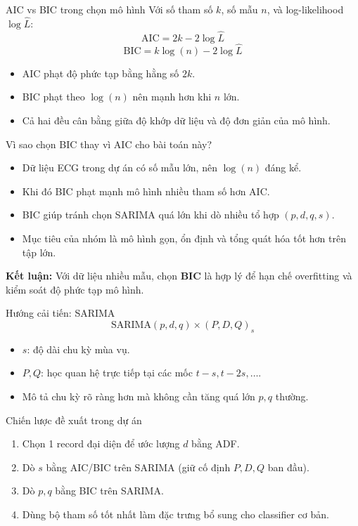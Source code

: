 \documentclass{beamer}
\begin{document}
\begin{frame}{AIC vs BIC trong chọn mô hình}
    Với số tham số $k$, số mẫu $n$, và log-likelihood $\log\hat{L}$:
    \[
        \text{AIC} = 2k - 2\log\hat{L}
    \]
    \[
        \text{BIC} = k\log(n) - 2\log\hat{L}
    \]
    \vspace{0.3cm}
    \begin{itemize}
        \item AIC phạt độ phức tạp bằng hằng số $2k$.
        \item BIC phạt theo $\log(n)$ nên mạnh hơn khi $n$ lớn.
        \item Cả hai đều cân bằng giữa độ khớp dữ liệu và độ đơn giản của mô hình.
    \end{itemize}
\end{frame}

\begin{frame}{Vì sao chọn BIC thay vì AIC cho bài toán này?}
    \begin{itemize}
        \item Dữ liệu ECG trong dự án có số mẫu lớn, nên $\log(n)$ đáng kể.
        \item Khi đó BIC phạt mạnh mô hình nhiều tham số hơn AIC.
        \item BIC giúp tránh chọn SARIMA quá lớn khi dò nhiều tổ hợp $(p,d,q,s)$.
        \item Mục tiêu của nhóm là mô hình gọn, ổn định và tổng quát hóa tốt hơn trên tập lớn.
    \end{itemize}
    \vspace{0.3cm}
    \textbf{Kết luận:} Với dữ liệu nhiều mẫu, chọn \textbf{BIC} là hợp lý để hạn chế overfitting
    và kiểm soát độ phức tạp mô hình.
\end{frame}

\begin{frame}{Hướng cải tiến: SARIMA}
    \[
        \text{SARIMA}(p,d,q)\times(P,D,Q)_s
    \]
    \begin{itemize}
        \item $s$: độ dài chu kỳ mùa vụ.
        \item $P,Q$: học quan hệ trực tiếp tại các mốc $t-s, t-2s, \dots$.
        \item Mô tả chu kỳ rõ ràng hơn mà không cần tăng quá lớn $p,q$ thường.
    \end{itemize}
\end{frame}

\begin{frame}{Chiến lược đề xuất trong dự án}
    \begin{enumerate}
        \item Chọn 1 record đại diện để ước lượng $d$ bằng ADF.
        \item Dò $s$ bằng AIC/BIC trên SARIMA (giữ cố định $P,D,Q$ ban đầu).
        \item Dò $p,q$ bằng BIC trên SARIMA.
        \item Dùng bộ tham số tốt nhất làm đặc trưng bổ sung cho classifier cơ bản.
    \end{enumerate}
\end{frame}
\end{document}
